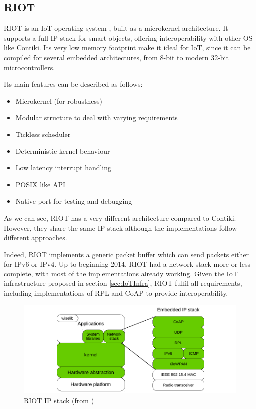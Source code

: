 \subsection{RIOT}
RIOT is an IoT operating system \cite{baccelli2013riot}, built as a microkernel architecture.
It supports a full IP stack for smart objects, offering interoperability with other OS like Contiki.
Its very low memory footprint make it ideal for IoT, since it can be compiled for several embedded architectures, from 8-bit to modern 32-bit microcontrollers.

Its main features can be described as follows:

\begin{itemize}
	\item Microkernel (for robustness)
	\item Modular structure to deal with varying requirements
	\item Tickless scheduler
	\item Deterministic kernel behaviour
	\item Low latency interrupt handling
	\item POSIX like API
	\item Native port for testing and debugging
\end{itemize}

As we can see, RIOT has a very different architecture compared to Contiki.
However, they share the same IP stack although the implementations follow different approaches.

Indeed, RIOT implements a generic packet buffer which can send packets either for IPv6 or IPv4.
Up to beginning 2014, RIOT had a network stack more or less complete, with most of the implementations already working.
Given the IoT infrastructure proposed in section \ref{sec:IoTInfra}, RIOT fulfil all requirements, including implementations of RPL and CoAP to provide interoperability.

\begin{figure}[htb]
	\centering
	\includegraphics[width=1\columnwidth]{chapters/background.images/RIOTModules.pdf}
	\caption{RIOT IP stack (from  \cite{riotOS})}
	\label{fig:RIOTIPStack}
\end{figure}

